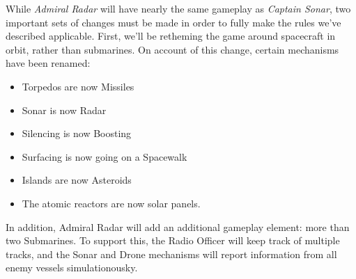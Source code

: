 While \textit{Admiral Radar} will have nearly the same gameplay as \textit{Captain Sonar}, two important sets of changes must be made in order to fully make the rules we've described applicable. First, we'll be retheming the game around spacecraft in orbit, rather than submarines. On account of this change, certain mechanisms have been renamed:

\begin{itemize}
\item Torpedos are now Missiles
\item Sonar is now Radar
\item Silencing is now Boosting
\item Surfacing is now going on a Spacewalk
\item Islands are now Asteroids
\item The atomic reactors are now solar panels.
\end{itemize}

In addition, Admiral Radar will add an additional gameplay element: more than two Submarines. To support this, the Radio Officer will keep track of multiple tracks, and the Sonar and Drone mechanisms will report information from all enemy vessels simulationousky. 